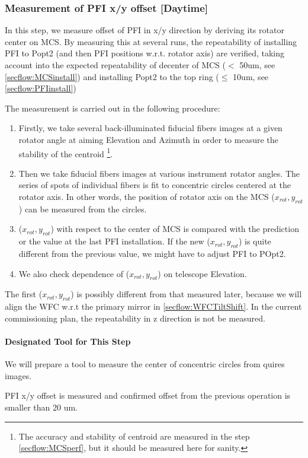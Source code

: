 \subsubsection{Measurement of PFI x/y offset [Daytime]}\label{secflow:PFIoffset}

In this step, we measure offset of PFI in x/y direction by deriving its rotator center on MCS.
By measuring this at several runs, the repeatability of installing PFI to Popt2 (and then PFI positions w.r.t. rotator axis) are verified, taking account into the expected repeatability of decenter of MCS ($<$ 50um, see \ref{secflow:MCSinstall}) and installing Popt2 to the top ring ($\leq$ 10um, see \ref{secflow:PFIinstall})

The measurement is carried out in the following procedure:
\begin{enumerate}
\item Firstly, we take several back-illuminated fiducial fibers images at a given rotator angle at aiming Elevation and Azimuth in order to measure the stability of the centroid \footnote{The accuracy and stability of centroid are measured in the step \ref{secflow:MCSperf}, but it should be measured here for sanity.}.
\item Then we take fiducial fibers images at various instrument rotator angles.
The series of spots of individual fibers is fit to concentric circles centered at the rotator axis.
In other words, the position of rotator axis on the MCS ($x_{rot}, y_{rot}$) can be measured from the circles. 
\item ($x_{rot}, y_{rot}$) with respect to the center of MCS is compared with the prediction or the value at the last PFI installation. 
If the new ($x_{rot}, y_{rot}$) is quite different from the previous value, we might have to adjust PFI to POpt2.
\item We also check dependence of ($x_{rot}, y_{rot}$) on telescope Elevation.
\end{enumerate}

The first ($x_{rot}, y_{rot}$) is possibly different from that measured later, because we will align the WFC w.r.t the primary mirror in \ref{secflow:WFCTiltShift}.
In the current commissioning plan, the repeatability in z direction is not be measured.

\paragraph{Designated Tool for This Step}
We will prepare a tool to measure the center of concentric circles from quires images.

\begin{itembox}[l]{}
PFI x/y offset is measured and confirmed offset from the previous operation is smaller than 20 um. 

\end{itembox}